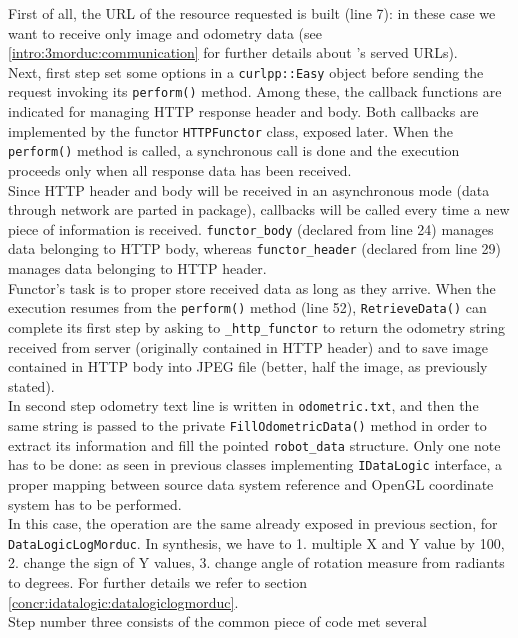 First of all, the URL of the resource requested is built (line 7):
in these case we want to receive only image and odometry data
(see \ref{intro:3morduc:communication} for further details about
\morduc{}'s served URLs).
\\
Next, first step set some options in a \texttt{curlpp::Easy} object
before sending the request invoking its \texttt{perform()} method. Among
these, the callback functions are indicated for managing HTTP response
header and body. Both callbacks are implemented by the functor
\texttt{HTTPFunctor} class, exposed later. When the \texttt{perform()}
method is called, a synchronous call is done and the execution proceeds
only when all response data has been received.
\\
Since HTTP header and body will be received in an asynchronous mode
(data through network are parted in package), callbacks will be
called every time a new piece of information is received.
\texttt{functor\_body} (declared from line 24) manages data belonging
to HTTP body, whereas \texttt{functor\_header} (declared from line 29)
manages data belonging to HTTP header.
\\
Functor's task is to proper store received data as long as they arrive.
When the execution resumes from the \texttt{perform()} method (line 52),
\texttt{RetrieveData()} can complete its first step by asking
to \texttt{\_http\_functor} to return the odometry string received from server
(originally contained in HTTP header) and to save image contained in
HTTP body into JPEG file (better, half the image, as previously stated).
\\
In second step odometry text line is written in \texttt{odometric.txt},
and then the same string is passed to the private \texttt{FillOdometricData()}
method in order to extract its information and fill the pointed
\texttt{robot\_data} structure. Only one note has to be done: as seen
in previous classes implementing \texttt{IDataLogic} interface, a
proper mapping between source data system reference and OpenGL coordinate
system has to be performed.
\\
In this case, the operation are the same already exposed in previous section,
for \texttt{DataLogicLogMorduc}. In synthesis, we have to 1. multiple X and Y
value by 100, 2. change the sign of  Y values, 3. change angle of rotation
measure from radiants to degrees. For further details we refer to section
\ref{concr:idatalogic:datalogiclogmorduc}.
\\
Step number three consists of the common piece of code met several

